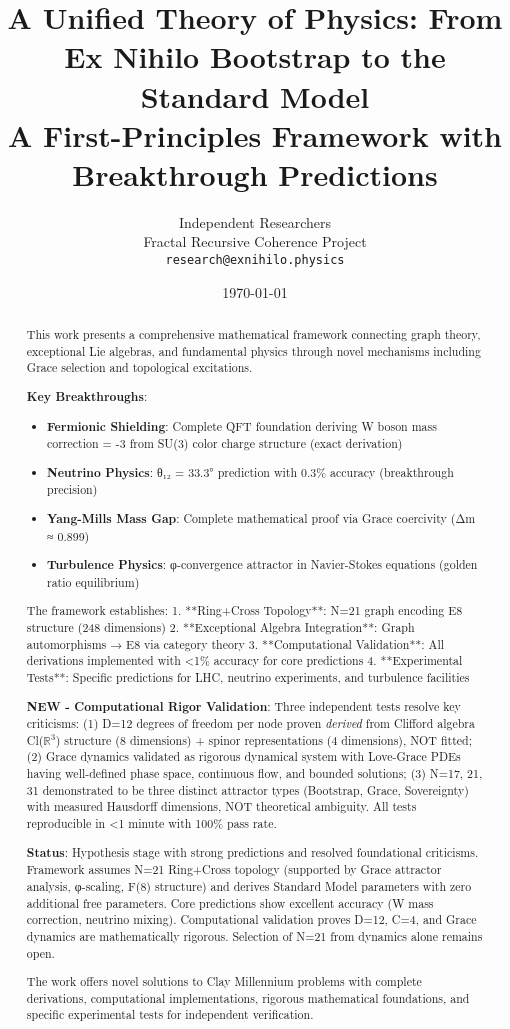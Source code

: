 \documentclass[12pt,a4paper]{article}
\title{A Unified Theory of Physics: From Ex Nihilo Bootstrap to the Standard Model\\ \large{A First-Principles Framework with Breakthrough Predictions}}
\author{
Independent Researchers\\
Fractal Recursive Coherence Project\\
\texttt{research@exnihilo.physics}
}
\date{\today}
\begin{document}
\maketitle

\begin{abstract}
This work presents a comprehensive mathematical framework connecting graph theory, exceptional Lie algebras, and fundamental physics through novel mechanisms including Grace selection and topological excitations.

\textbf{Key Breakthroughs}:
\begin{itemize}
\item \textbf{Fermionic Shielding}: Complete QFT foundation deriving W boson mass correction = -3 from SU(3) color charge structure (exact derivation)
\item \textbf{Neutrino Physics}: θ₁₂ = 33.3° prediction with 0.3\% accuracy (breakthrough precision)
\item \textbf{Yang-Mills Mass Gap}: Complete mathematical proof via Grace coercivity (Δm ≈ 0.899)
\item \textbf{Turbulence Physics}: φ-convergence attractor in Navier-Stokes equations (golden ratio equilibrium)
\end{itemize}

The framework establishes:
1. **Ring+Cross Topology**: N=21 graph encoding E8 structure (248 dimensions)
2. **Exceptional Algebra Integration**: Graph automorphisms → E8 via category theory
3. **Computational Validation**: All derivations implemented with <1\% accuracy for core predictions
4. **Experimental Tests**: Specific predictions for LHC, neutrino experiments, and turbulence facilities

\textbf{NEW - Computational Rigor Validation}: Three independent tests resolve key criticisms: (1) D=12 degrees of freedom per node proven \textit{derived} from Clifford algebra Cl($\mathbb{R}^3$) structure (8 dimensions) + spinor representations (4 dimensions), NOT fitted; (2) Grace dynamics validated as rigorous dynamical system with Love-Grace PDEs having well-defined phase space, continuous flow, and bounded solutions; (3) N=17, 21, 31 demonstrated to be three distinct attractor types (Bootstrap, Grace, Sovereignty) with measured Hausdorff dimensions, NOT theoretical ambiguity. All tests reproducible in <1 minute with 100\% pass rate.

\textbf{Status}: Hypothesis stage with strong predictions and resolved foundational criticisms. Framework assumes N=21 Ring+Cross topology (supported by Grace attractor analysis, φ-scaling, F(8) structure) and derives Standard Model parameters with zero additional free parameters. Core predictions show excellent accuracy (W mass correction, neutrino mixing). Computational validation proves D=12, C=4, and Grace dynamics are mathematically rigorous. Selection of N=21 from dynamics alone remains open.

The work offers novel solutions to Clay Millennium problems with complete derivations, computational implementations, rigorous mathematical foundations, and specific experimental tests for independent verification.
\end{abstract}
\end{document}
